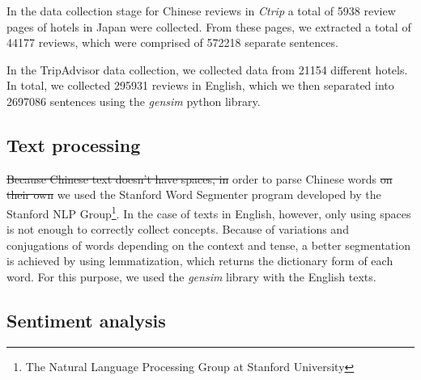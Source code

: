 \documentclass[review]{elsarticle}
\providecommand{\DIFadd}[1]{{\protect\color{blue}\uwave{#1}}} %
\providecommand{\DIFdel}[1]{{\protect\color{red}\sout{#1}}}                      %
\providecommand{\DIFaddbegin}{} %
\providecommand{\DIFaddend}{} %
\providecommand{\DIFdelbegin}{} %
\providecommand{\DIFdelend}{} %
\newcommand{\DIFscaledelfig}{0.5}
\newlength{\DIFdelgraphicswidth} %
\newlength{\DIFdelgraphicsheight} %
\newcommand{\DIFaddincludegraphics}[2][]{{\color{blue}\fbox{\DIFOincludegraphics[#1]{#2}}}} %
\newcommand{\DIFdelincludegraphics}[2][]{%
\sbox{\DIFdelgraphicsbox}{\DIFOincludegraphics[#1]{#2}}%
\settoboxwidth{\DIFdelgraphicswidth}{\DIFdelgraphicsbox} %
\settoboxtotalheight{\DIFdelgraphicsheight}{\DIFdelgraphicsbox} %
\scalebox{\DIFscaledelfig}{%
\parbox[b]{\DIFdelgraphicswidth}{\usebox{\DIFdelgraphicsbox}\\[-\baselineskip] \rule{\DIFdelgraphicswidth}{0em}}\llap{\resizebox{\DIFdelgraphicswidth}{\DIFdelgraphicsheight}{%
\setlength{\unitlength}{\DIFdelgraphicswidth}%
\begin{picture}(1,1)%
\thicklines\linethickness{2pt} %
{\color[rgb]{1,0,0}\put(0,0){\framebox(1,1){}}}%
{\color[rgb]{1,0,0}\put(0,0){\line( 1,1){1}}}%
{\color[rgb]{1,0,0}\put(0,1){\line(1,-1){1}}}%
\end{picture}%
}\hspace*{3pt}}} %
} %
\DeclareRobustCommand{\DIFaddbegin}{\DIFOaddbegin \let\includegraphics\DIFaddincludegraphics} %
\DeclareRobustCommand{\DIFaddend}{\DIFOaddend \let\includegraphics\DIFOincludegraphics} %
\DeclareRobustCommand{\DIFdelbegin}{\DIFOdelbegin \let\includegraphics\DIFdelincludegraphics} %
\DeclareRobustCommand{\DIFdelend}{\DIFOaddend \let\includegraphics\DIFOincludegraphics} %
\begin{document}
In the data collection stage for Chinese reviews in \textit{Ctrip} a total of \num[group-separator={,}]{5938} review pages of hotels in Japan were collected. From these pages, we extracted a total of \num[group-separator={,}]{44177} reviews, which were comprised of \num[group-separator={,}]{572218} separate sentences. 

\DIFdelbegin %

\DIFdelend In the TripAdvisor data collection, we collected data from \num[group-separator={,}]{21154} different hotels. In total, we collected \num[group-separator={,}]{295931} reviews in English, which we then separated into \num[group-separator={,}]{2697086} sentences using the \textit{gensim} python library. 

\subsection{Text processing}\label{textprocessing}

\DIFdelbegin \DIFdel{Because Chinese text doesn't have spaces, in }\DIFdelend \DIFaddbegin \DIFadd{In }\DIFaddend order to parse Chinese words \DIFdelbegin \DIFdel{on their own }\DIFdelend \DIFaddbegin \DIFadd{and separate them }\DIFaddend we used the Stanford Word Segmenter \cite[][]{chang2008} program developed by the Stanford NLP Group\footnote{\label{stanfordnlp}The Natural Language Processing Group at Stanford University}. In the case of texts in English, however, only using spaces is not enough to correctly collect concepts. Because of variations and conjugations of words depending on the context and tense, a better segmentation is achieved by using lemmatization, which returns the dictionary form of each word. For this purpose, we used the \textit{gensim} library with the English texts.

\subsection{Sentiment analysis}\label{sentimentanalysis}
\end{document}
